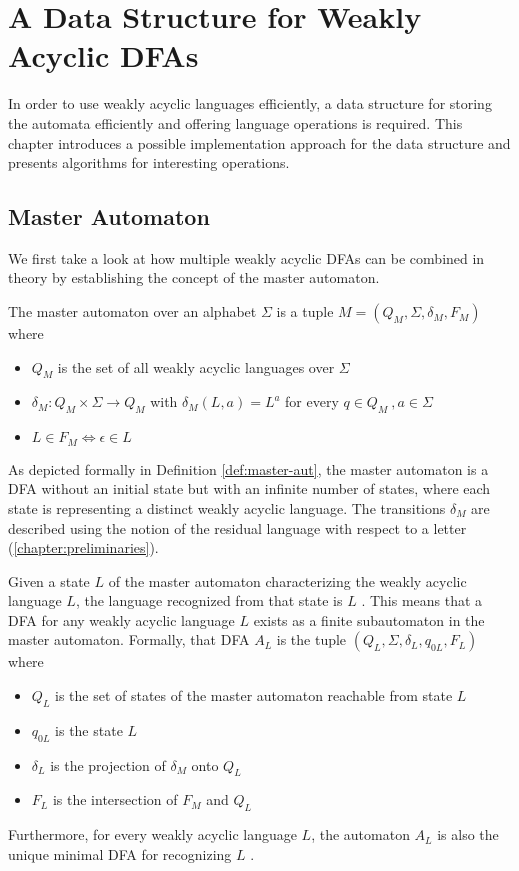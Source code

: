 \chapter{A Data Structure for Weakly Acyclic DFAs}\label{chapter:datastructure}
In order to use weakly acyclic languages efficiently, a data structure for storing the automata efficiently and offering language operations is required. This chapter introduces a possible implementation approach for the data structure and presents algorithms for interesting operations.

\section{Master Automaton}\label{sec:master-aut}
We first take a look at how multiple weakly acyclic DFAs can be combined in theory by establishing the concept of the master automaton. 
\begin{definition}\label{def:master-aut}
The master automaton over an alphabet $\Sigma$ is a tuple $M = (Q_{M},\Sigma,\delta_{M},F_{M})$ where 
\begin{itemize}[--,noitemsep]
\item $Q_{M}$ is the set of all weakly acyclic languages over $\Sigma$
\item $\delta_{M}: Q_{M} \times \Sigma \rightarrow Q_{M}$  with $\delta_{M}(L,a) = L^{a}$ for every $q \in Q_{M} \ , a \in \Sigma$
\item $L \in F_{M} \iff \epsilon \in L$
\end{itemize}
\end{definition}
As depicted formally in Definition \autoref{def:master-aut}, the master automaton is a DFA without an initial state but with an infinite number of states, where each state is representing a distinct weakly acyclic language. The transitions $\delta_{M}$ are described using the notion of the residual language with respect to a letter (\autoref{chapter:preliminaries}).

\par

Given a state $L$ of the master automaton characterizing the weakly acyclic language $L$, the language recognized from that state is $L$ \cite[Proposition~8]{blondin_24}. This means that a DFA for any weakly acyclic language $L$ exists as a finite subautomaton in the master automaton. Formally, that DFA $A_{L}$ is the tuple $(Q_{L},\Sigma,\delta_{L},q_{0L},F_{L})$ where 
\begin{itemize}[--,noitemsep]
\item $Q_{L}$ is the set of states of the master automaton reachable from state $L$
\item $q_{0L}$ is the state $L$
\item $\delta_{L}$ is the projection of $\delta_{M}$ onto $Q_{L}$
\item $F_{L}$ is the intersection of $F_{M}$ and $Q_{L}$
\end{itemize}
Furthermore, for every weakly acyclic language $L$, the automaton $A_{L}$ is also the unique minimal DFA for recognizing $L$ \cite[Proposition~9]{blondin_24}. 

